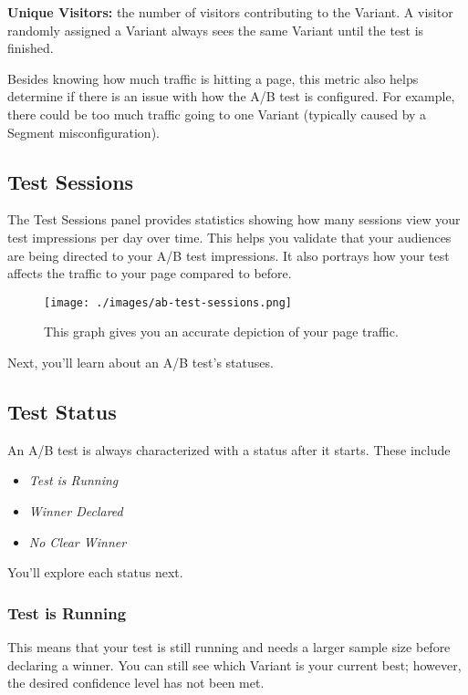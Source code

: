 \textbf{Unique Visitors:} the number of visitors contributing to the
Variant. A visitor randomly assigned a Variant always sees the same
Variant until the test is finished.

Besides knowing how much traffic is hitting a page, this metric also
helps determine if there is an issue with how the A/B test is
configured. For example, there could be too much traffic going to one
Variant (typically caused by a Segment misconfiguration).

\subsection{Test Sessions}\label{test-sessions}

The Test Sessions panel provides statistics showing how many sessions
view your test impressions per day over time. This helps you validate
that your audiences are being directed to your A/B test impressions. It
also portrays how your test affects the traffic to your page compared to
before.

\begin{figure}
\centering
\texttt{[image: ./images/ab-test-sessions.png]}
\caption{This graph gives you an accurate depiction of your page
traffic.}
\end{figure}

Next, you'll learn about an A/B test's statuses.

\subsection{Test Status}\label{test-status}

An A/B test is always characterized with a status after it starts. These
include

\begin{itemize}
\tightlist
\item
  \emph{Test is Running}
\item
  \emph{Winner Declared}
\item
  \emph{No Clear Winner}
\end{itemize}

You'll explore each status next.

\subsubsection{Test is Running}\label{test-is-running}

This means that your test is still running and needs a larger sample
size before declaring a winner. You can still see which Variant is your
current best; however, the desired confidence level has not been met.


